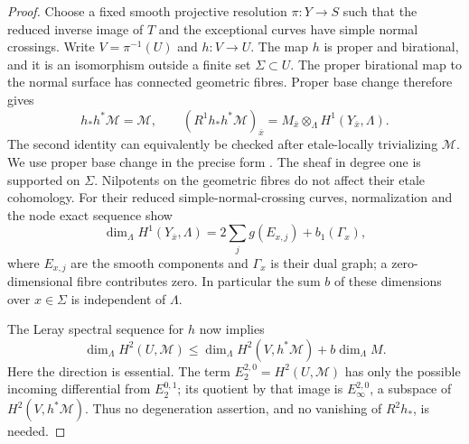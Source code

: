 \begin{proof}
Choose a fixed smooth projective resolution
$\pi:Y\to S$ such that the reduced inverse image of $T$
and the exceptional curves have simple normal crossings.
Write $V=\pi^{-1}(U)$ and $h:V\to U$.  The map $h$ is
proper and birational, and it is an isomorphism outside
a finite set $\Sigma\subset U$.  The proper birational
map to the normal surface has connected geometric fibres.
Proper base change therefore gives
\[
             h_*h^*\mathcal M=\mathcal M,
\qquad
 (R^1h_*h^*\mathcal M)_{\bar x}
     =M_{\bar x}\otimes_\Lambda H^1(Y_{\bar x},\Lambda).
                                                        \tag{D.H2.5}
\]
The second identity can equivalently be checked after
etale-locally trivializing $\mathcal M$.  We use proper
base change in the precise form
\citep[Theorems~17.7 and~17.10, pp.~116--117]
{MilneLEC2013H2D}.
The sheaf in degree one is supported on $\Sigma$.
Nilpotents on the geometric fibres do not affect their
etale cohomology.  For their reduced simple-normal-crossing
curves, normalization and the node exact sequence show
\[
 \dim_\Lambda H^1(Y_{\bar x},\Lambda)
     =2\sum_jg(E_{x,j})+b_1(\Gamma_x),                    \tag{D.H2.6}
\]
where $E_{x,j}$ are the smooth components and $\Gamma_x$
is their dual graph; a zero-dimensional fibre contributes
zero.  In particular the sum $b$ of these dimensions over
$x\in\Sigma$ is independent of $\Lambda$.

The Leray spectral sequence for $h$
\citep[Theorem~12.7, pp.~82--83]{MilneLEC2013H2D}
now implies
\[
 \dim_\Lambda H^2(U,\mathcal M)
       \le \dim_\Lambda H^2(V,h^*\mathcal M)
                                +b\dim_\Lambda M.       \tag{D.H2.7}
\]
Here the direction is essential.  The term
$E_2^{2,0}=H^2(U,\mathcal M)$ has only the possible
incoming differential from $E_2^{0,1}$; its quotient
by that image is $E_\infty^{2,0}$, a subspace of
$H^2(V,h^*\mathcal M)$.  Thus no degeneration
assertion, and no vanishing of $R^2h_*$, is needed.


\end{proof}
